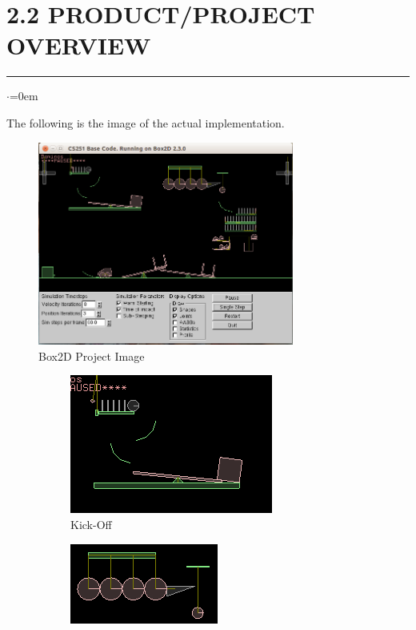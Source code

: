 \documentclass{report}
\begin{document}
\section*{2.2 PRODUCT/PROJECT OVERVIEW}
\hrule
\large
\begin{list}{$\cdot$}{\leftmargin=0em}
\item The following is the image of the actual implementation.
\begin{figure}[h]%
\centering
\includegraphics[width=0.75\textwidth, width=0.65\textwidth]{latex/box2d_prelim2.png}%
\caption{Box2D Project Image}
\end{figure}
\begin{figure}
\begin{subfigure}[h]{0.3\textwidth}
\includegraphics[width=\textwidth, height=0.5\textwidth]{latex/box2d_1.png}
\caption{Kick-Off}
\end{subfigure}
\begin{subfigure}[h]{0.3\textwidth}
\includegraphics[width=\textwidth, height=0.5\textwidth]{latex/box2d_2.png}

\end{subfigure}
\end{figure}
\end{list}
\end{document}
